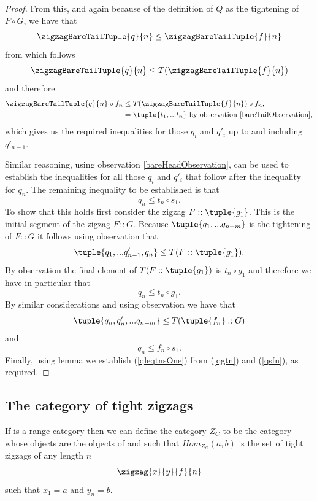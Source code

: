 \begin{proof}
From this, and again because of the definition of $Q$ as the tightening
of $F \circ G$, we have that 
\[
\zigzagBareTailTuple{q}{n} \leq \zigzagBareTailTuple{f}{n}
\]
from which follows 
\[
\zigzagBareTailTuple{q}{n}  \leq T(\zigzagBareTailTuple{f}{n})
\]
and therefore
\begin{align*}
\zigzagBareTailTuple{q}{n} \circ f_n  &\leq T(\zigzagBareTailTuple{f}{n}) \circ f_n,\\
                                 &=  \tuple{t_1,... t_n} 
                                 \mbox{ by observation \ref{bareTailObservation},} \\
\end{align*}
which gives us the required inequalities for those $q_i$ and $q'_i$ up to and including $q'_{n-1}$.

Similar reasoning, using observation \ref{bareHeadObservation}, can be used to establish
the inequalities for all those $q_i$ and $q'_i$ that follow after the inequality for
$q_n$. The remaining inequality to be established is that
\[
\label{qleqtnsOne}
q_n \leq t_n \circ s_1.
\]
To show that this holds first consider the zigzag $F :: \tuple{g_1}$.
This is the initial segment of the zigzag $F :: G$. 
Because $\tuple{q_1,...q_{n+m}}$ is the tightening of 
$F :: G$ it follows
using observation   that 
\begin{equation}
\label{qTFg}
\tuple{q_1,...q'_{n-1},q_n} \leq T(F :: \tuple{g_1}).
\end{equation} 
By observation  
the final element of $T(F :: \tuple{g_1})$ is $t_n \circ g_1$
and therefore we have in particular that
\begin{equation}
\label{qgtn}
q_n \leq t_n \circ g_1.
\end{equation}
By similar considerations and using observation 
we have that 
\begin{equation}
\label{qTfG}
\tuple{q_n, q'_n,...q_{n+m}} \leq T(\tuple{f_n} :: G)
\end{equation}
and 
\begin{equation}
\label{qsfn}
q_n \leq f_n \circ s_1.
\end{equation}
Finally, using lemma  we establish  
(\ref{qleqtnsOne}) from
(\ref{qgtn}) and (\ref{qsfn}), as required.
\end{proof}


\subsection{The category of tight zigzags}
If \catcw is a range category then we can define the category
$Z_C$ to be the category whose objects are the objects of \catcw
and such that $Hom_{Z_C}(a,b)$ is the set of tight zigzags of any length $n$
$$
\arraycolsep=7pt
\zigzag{x}{y}{f}{n}
$$
such that $x_1=a$ and $y_n=b$.


